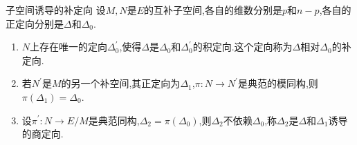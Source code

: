 \begin{proposition}{子空间诱导的补定向}{}
	设$M,N$是$E$的互补子空间,各自的维数分别是$p$和$n-p$,各自的正定向分别是$\Delta$和$\Delta_{0}$.
	\begin{enumerate}
		\item $N$上存在唯一的定向$\Delta_{0}^{\prime}$,使得$\Delta$是$\Delta_{0}$和$\Delta_{0}^{\prime}$的积定向.这个定向称为$\Delta$相对$\Delta_{0}$的补定向.
		\item 若$N^{\prime}$是$M$的另一个补空间,其正定向为$\Delta_{1}$,$\pi:N\to N^{\prime}$是典范的模同构,则$\pi\left(\Delta_{1}\right)=\Delta_{0}$.
		\item 设$\pi^{\prime}:N\to E/M$是典范同构,$\Delta_{2}=\pi\left(\Delta_{0}\right)$,则$\Delta_{2}$不依赖$\Delta_{0}$,称$\Delta_{2}$是$\Delta$和$\Delta_{1}$诱导的商定向.
	\end{enumerate}
\end{proposition}
